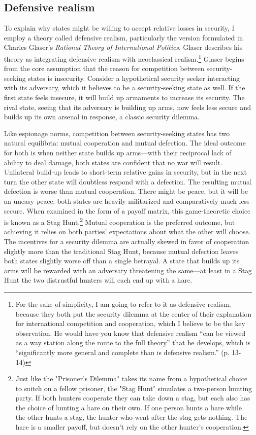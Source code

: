 \documentclass[12pt]{extarticle}
\begin{document}
\subsection{Defensive realism}
To explain why states might be willing to accept relative losses in security, I employ a theory called defensive realism, particularly the version formulated in Charles Glaser's \emph{Rational Theory of International Politics}. Glaser describes his theory as integrating defensive realism with neoclassical realism.\footnote{For the sake of simplicity, I am going to refer to it as defensive realism, because they both put the security dilemma at the center of their explanation for international competition and cooperation, which I believe to be the key observation. He would have you know that defensive realism \enquote{can be viewed as a way station along the route to the full theory} that he develops, which is \enquote{significantly more general and complete than is defensive realism.} (p. 13-14)} Glaser begins from the core assumption that the reason for competition between security-seeking states is insecurity. Consider a hypothetical security seeker interacting with its adversary, which it believes to be a security-seeking state as well. If the first state feels insecure, it will build up armaments to increase its security. The rival state, seeing that its adversary is building up arms, now feels less secure and builds up its own arsenal in response, a classic security dilemma.

Like espionage norms, competition between security-seeking states has two natural equilibria: mutual cooperation and mutual defection. The ideal outcome for both is when neither state builds up arms---with their reciprocal lack of ability to deal damage, both states are confident that no war will result. Unilateral build-up leads to short-term relative gains in security, but in the next turn the other state will doubtless respond with a defection. The resulting mutual defection is worse than mutual cooperation. There might be peace, but it will be an uneasy peace; both states are heavily militarized and comparatively much less secure. When examined in the form of a payoff matrix, this game-theoretic choice is known as a Stag Hunt.\footnote{Just like the "Prisoner's Dilemma" takes its name from a hypothetical choice to snitch on a fellow prisoner, the "Stag Hunt" simulates a two-person hunting party. If both hunters cooperate they can take down a stag, but each also has the choice of hunting a hare on their own. If one person hunts a hare while the other hunts a stag, the hunter who went after the stag gets nothing. The hare is a smaller payoff, but doesn't rely on the other hunter's cooperation.} Mutual cooperation is the preferred outcome, but achieving it relies on both parties' expectations about what the other will choose. The incentives for a security dilemma are actually skewed in favor of cooperation slightly more than the traditional Stag Hunt, because mutual defection leaves both states slightly worse off than a single betrayal. A state that builds up its arms will be rewarded with an adversary threatening the same---at least in a Stag Hunt the two distrustful hunters will each end up with a hare.
\end{document}

